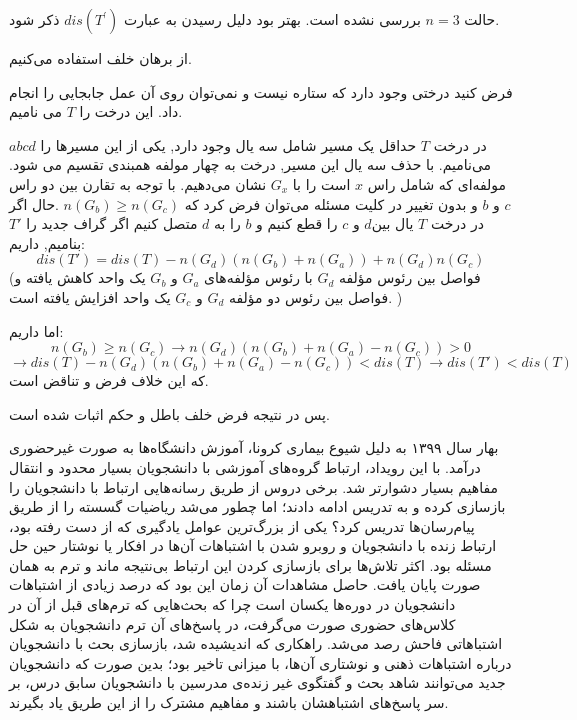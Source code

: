 \documentclass[11pt,largemargins]{h2wp}
\begin{document}
  حالت 
  $n=3$
  بررسی نشده است.
بهتر بود دلیل رسیدن به عبارت $dis(T^\prime)$
ذکر شود.

  
    از برهان خلف استفاده می‌کنیم.
    
    فرض کنید درختی وجود دارد که ستاره نیست و نمی‌توان روی آن عمل جابجایی را انجام داد. این درخت را $T$ می نامیم.
    
    در درخت     
    $T$
    حداقل یک مسیر شامل سه یال وجود دارد, یکی از این مسیرها
     را
            $abcd$
        می‌نامیم. با حذف سه یال این مسیر, درخت به چهار مولفه همبندی تقسیم می شود. مولفه‌ای که شامل راس 
   $x$ 
    است را با
    $G_x$
نشان می‌دهیم. با توجه به تقارن بین دو راس
$c$
و
$b$
 و بدون تغییر در کلیت مسئله می‌توان فرض کرد که
 $n(G_b)\geq n(G_c)$
 .حال اگر در درخت 
 $T$
 یال بین$d$  و $c$ را قطع کنیم و  $b$  را به  $d$  متصل کنیم اگر گراف جدید را 
$T'$ 
 بنامیم, 
 داریم:
 \[dis(T')=dis(T)-n(G_d)(n(G_b)+n(G_a))+n(G_d)n(G_c)\]
 (فواصل بین رئوس مؤلفه  $G_d$ با رئوس مؤلفه‌های  $G_a$ و  $G_b$ یک واحد کاهش یافته و فواصل بین رئوس دو مؤلفه‌  $G_d$ و  $G_c$ یک واحد افزایش یافته است. )
 
 اما داریم:
 \[n(G_b)\geq n(G_c)\rightarrow n(G_d)(n(G_b)+n(G_a)-n(G_c))>0\]\[\rightarrow dis(T)-n(G_d)(n(G_b)+n(G_a)-n(G_c))<dis(T)\rightarrow dis(T')<dis(T)\]
  که این خلاف فرض و تناقض است.
     
     پس در نتیجه فرض خلف باطل و حکم اثبات شده است.
    
  

بهار سال ۱۳۹۹ به دلیل شیوع بیماری کرونا، آموزش دانشگاه‌ها به صورت غیرحضوری درآمد. با این رویداد، ارتباط گروه‌های آموزشی
با دانشجویان بسیار محدود و انتقال مفاهیم بسیار دشوارتر شد. برخی دروس از طریق رسانه‌هایی ارتباط با دانشجویان را بازسازی کرده و
به تدریس ادامه دادند؛ اما چطور می‌شد ریاضیات گسسته را از طریق پیام‌رسان‌ها تدریس کرد؟
یکی از بزرگ‌ترین عوامل یادگیری که از دست رفته بود، ارتباط زنده با دانشجویان و روبرو شدن با اشتباهات آن‌ها در افکار یا نوشتار حین حل مسئله بود.
اکثر تلاش‌ها برای بازسازی کردن این ارتباط بی‌نتیجه ماند و ترم به همان صورت پایان یافت. حاصل مشاهدات آن زمان این بود که درصد زیادی از اشتباهات
دانشجویان در دوره‌ها یکسان است چرا که بحث‌هایی که ترم‌های قبل از آن در کلاس‌های حضوری صورت می‌گرفت، در پاسخ‌های آن ترم دانشجویان به شکل
اشتباهاتی فاحش رصد می‌شد. راهکاری که اندیشیده شد، بازسازی بحث با دانشجویان درباره اشتباهات ذهنی و نوشتاری آن‌ها، با میزانی تاخیر بود؛
بدین صورت که دانشجویان جدید می‌توانند شاهد بحث و گفتگوی غیر زنده‌ی مدرسین با دانشجویان سابق درس، بر سر پاسخ‌های اشتباهشان باشند و مفاهیم مشترک را
از این طریق یاد بگیرند.
\end{document}
